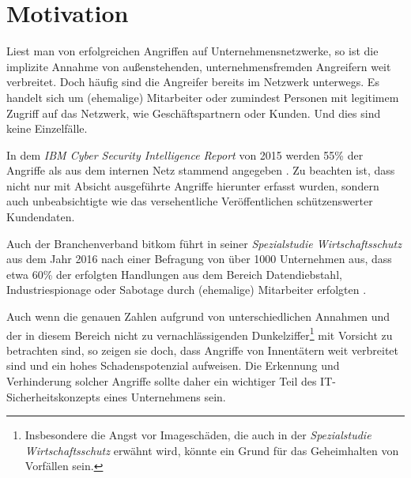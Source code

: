 \documentclass[
    fontsize=12pt,
    headings=small,
    parskip=half,           %
    bibliography=totoc,
    numbers=noenddot,       %
    open=any,               %
    ]{scrreprt}
\begin{document}
\section{Motivation}








Liest man von erfolgreichen Angriffen auf Unternehmensnetzwerke, so ist die implizite Annahme von außenstehenden, unternehmensfremden Angreifern weit verbreitet. Doch häufig sind die Angreifer bereits im Netzwerk unterwegs. Es handelt sich um (ehemalige) Mitarbeiter oder zumindest Personen mit legitimem Zugriff auf das Netzwerk, wie Geschäftspartnern oder Kunden. Und dies sind keine Einzelfälle. 

In dem \textit{IBM Cyber Security Intelligence Report} von 2015 werden 55\% der Angriffe als aus dem internen Netz stammend angegeben \cite{ibm2015}. Zu beachten ist, dass nicht nur mit Absicht ausgeführte Angriffe hierunter erfasst wurden, sondern auch unbeabsichtigte wie das versehentliche Veröffentlichen schützenswerter Kundendaten.

Auch der Branchenverband bitkom führt in seiner \textit{Spezialstudie Wirtschaftsschutz} aus dem Jahr 2016 nach einer Befragung von über 1000 Unternehmen aus, dass etwa 60\% der erfolgten Handlungen aus dem Bereich Datendiebstahl, Industriespionage oder Sabotage durch (ehemalige) Mitarbeiter erfolgten \cite{bitkom2016}.


Auch wenn die genauen Zahlen aufgrund von unterschiedlichen Annahmen und der in diesem Bereich nicht zu vernachlässigenden Dunkelziffer\footnote{Insbesondere die Angst vor Imageschäden, die auch in der \textit{Spezialstudie Wirtschaftsschutz} erwähnt wird, könnte ein Grund für das Geheimhalten von Vorfällen sein.} mit Vorsicht zu betrachten sind, so zeigen sie doch, dass Angriffe von Innentätern weit verbreitet sind und ein hohes Schadenspotenzial aufweisen. Die Erkennung und Verhinderung solcher Angriffe sollte daher ein wichtiger Teil des IT-Sicherheitskonzepts eines Unternehmens sein.
\end{document}
